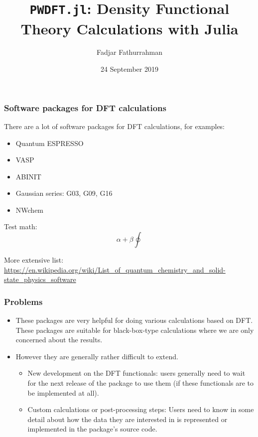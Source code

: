 \documentclass[english,9pt]{beamer}
\begin{document}
\title{\texttt{PWDFT.jl}: Density Functional Theory Calculations with Julia}
\author{Fadjar Fathurrahman}
\date{24 September 2019}

\frame{\titlepage}

\begin{frame}
\frametitle{Software packages for DFT calculations}

There are a lot of software packages for DFT calculations, for examples:
\begin{itemize}
\item Quantum ESPRESSO
\item VASP
\item ABINIT
\item Gaussian series: G03, G09, G16
\item NWchem
\end{itemize}

Test math:
\begin{equation}
\alpha + \beta \oint
\end{equation}


More extensive list:
{\scriptsize
\url{https://en.wikipedia.org/wiki/List_of_quantum_chemistry_and_solid-state_physics_software}
}

\end{frame}


\begin{frame}
\frametitle{Problems}

\begin{itemize}
\item These packages are very helpful for doing various calculations based on DFT.
%
These packages are suitable for black-box-type calculations where we are only concerned about the results.
%
\item However they are generally rather difficult to extend.
  \begin{itemize}
  \item New development on the DFT functionals:
  users generally need to wait for the next release of the package to use them
  (if these functionals are to be implemented at all).
  \item Custom calculations or post-processing steps:
  Users need to know in some detail
  about how the data they are interested in is represented or implemented in the package's source code.
  \end{itemize}
\end{itemize}

\end{frame}
\end{document}
